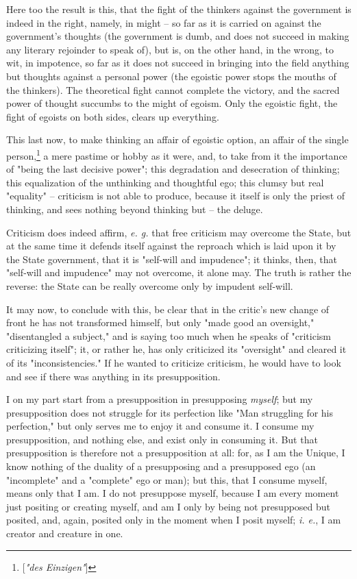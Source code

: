 \documentclass[a4paper]{book}
\begin{document}
Here too the result is this, that the fight of the thinkers against the 
government is indeed in the right, namely, in might -- so far as it is carried 
on against the government's thoughts (the government is dumb, and does not 
succeed in making any literary rejoinder to speak of), but is, on the other 
hand, in the wrong, to wit, in impotence, so far as it does not succeed in 
bringing into the field anything but thoughts against a personal power (the 
egoistic power stops the mouths of the thinkers). The theoretical fight cannot 
complete the victory, and the sacred power of thought succumbs to the might of 
egoism. Only the egoistic fight, the fight of egoists on both sides, clears up 
everything.

This last now, to make thinking an affair of egoistic option, an affair of the 
single person,\footnote{[\textit{"{}des Einzigen"{}}]} a mere pastime or hobby 
as it were, and, to take from it the importance of "{}being the last decisive 
power"{}; this degradation and desecration of thinking; this equalization of 
the unthinking and thoughtful ego; this clumsy but real "{}equality"{} -- 
criticism is not able to produce, because it itself is only the priest of 
thinking, and sees nothing beyond thinking but -- the deluge.

Criticism does indeed affirm, \textit{e. g.} that free criticism may overcome 
the State, but at the same time it defends itself against the reproach which 
is laid upon it by the State government, that it is "{}self-will and 
impudence"{}; it thinks, then, that "{}self-will and impudence"{} may not 
overcome, it alone may. The truth is rather the reverse: the State can be 
really overcome only by impudent self-will.

It may now, to conclude with this, be clear that in the critic's new change of 
front he has not transformed himself, but only "{}made good an oversight,"{} 
"{}disentangled a subject,"{} and is saying too much when he speaks of 
"{}criticism criticizing itself"{}; it, or rather he, has only criticized its 
"{}oversight"{} and cleared it of its "{}inconsistencies."{} If he wanted to 
criticize criticism, he would have to look and see if there was anything in 
its presupposition.

I on my part start from a presupposition in presupposing \textit{myself}; but 
my presupposition does not struggle for its perfection like "{}Man struggling 
for his perfection,"{} but only serves me to enjoy it and consume it. I 
consume my presupposition, and nothing else, and exist only in consuming it. 
But that presupposition is therefore not a presupposition at all: for, as I am 
the Unique, I know nothing of the duality of a presupposing and a presupposed 
ego (an "{}incomplete"{} and a "{}complete"{} ego or man); but this, that I 
consume myself, means only that I am. I do not presuppose myself, because I am 
every moment just positing or creating myself, and am I only by being not 
presupposed but posited, and, again, posited only in the moment when I posit 
myself; \textit{i. e.}, I am creator and creature in one.
\end{document}
